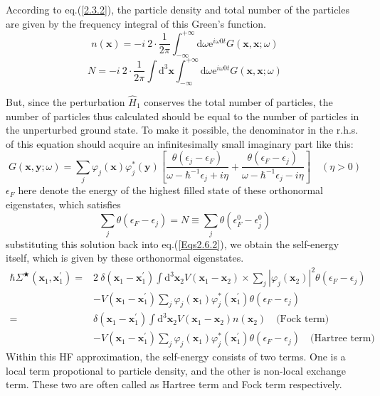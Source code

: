 According to eq.(\ref{2.3.2}), the particle density and total number of the particles are given by the frequency integral of this Green's function.
\[ n(\mathbf{x}) = - i \ 2 \cdot \frac{1}{2\pi} \int_{-\infty}^{+\infty} \mathrm{d} \omega \mathrm{e}^{i \omega  0 t} G(\mathbf{x},\mathbf{x};\omega) \]
\[ N = -i \ 2 \cdot \frac{1}{2\pi} \int \mathrm{d}^3 \mathbf{x} \int_{-\infty}^{+\infty} \mathrm{d} \omega \mathrm{e}^{i \omega  0 t} G(\mathbf{x},\mathbf{x};\omega) \]


But, since the perturbation $\hat{H}_1$ conserves the total number of particles, the number of particles thus calculated should be equal to the number of particles in the unperturbed ground state. To make it possible, the denominator in the r.h.s. of this equation should acquire an infinitesimally small imaginary part like this:
\begin{equation}\label{Eqs2.6.6}
G(\mathbf{x},\mathbf{y};\omega) = \sum_j \varphi_j(\mathbf{x}) \varphi_j^* (\mathbf{y})
\left[ \frac{\theta(\epsilon_j - \epsilon_F)}{\omega - \hbar^{-1}\epsilon_j + i \eta} + \frac{\theta(\epsilon_F - \epsilon_j)}{\omega - \hbar^{-1}\epsilon_j - i \eta} \right]   \quad (\eta > 0)
\end{equation}
$\epsilon_F $ here denote the energy of the highest filled state of these orthonormal eigenstates, which satisfies
\[ \sum_j \theta(\epsilon_F - \epsilon_j) = N \equiv \sum_j \theta(\epsilon_F^0 - \epsilon_j^0) \]
substituting this solution back into eq.(\ref{Eqs2.6.2}), we obtain the self-energy itself, which is given by these orthonormal eigenstates.
\begin{equation}\label{Eqs2.6.7} \begin{split}
 \hbar \Sigma^\bigstar (\mathbf{x}_1,\mathbf{x}_1^{'}) =
& 2 \ \delta(\mathbf{x}_1 - \mathbf{x}_1^{'}) \int \mathrm{d}^3 \mathbf{x}_2 V(\mathbf{x}_1 - \mathbf{x}_2) \times \sum_j |\varphi_j(\mathbf{x}_2)|^2 \theta(\epsilon_F - \epsilon_j) \\
&- V(\mathbf{x}_1 - \mathbf{x}_1^{'}) \sum_j \varphi_j (\mathbf{x}_1) \varphi_j^* (\mathbf{x}_1^{'}) \theta(\epsilon_F - \epsilon_j) \\
=& \delta(\mathbf{x}_1 - \mathbf{x}_1^{'}) \int \mathrm{d}^3 \mathbf{x}_2 V(\mathbf{x}_1 - \mathbf{x}_2) n(\mathbf{x}_2) \quad \text{(Fock term)}\\
&- V(\mathbf{x}_1 - \mathbf{x}_1^{'})\sum_j \varphi_j(\mathbf{x}_1)\varphi_j^*(\mathbf{x}_1^{'})\theta(\epsilon_F - \epsilon_j) \quad \text{(Hartree term)}
\end{split}\end{equation}
Within this HF approximation, the self-energy consists of two terms. One is a local term propotional to particle density, and the other is non-local exchange term. These two are often called as Hartree term and Fock term respectively.

